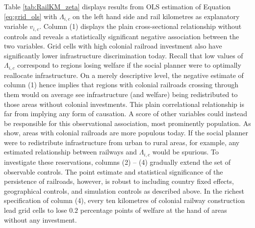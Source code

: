 \documentclass[11pt, oneside]{article}   	%
\begin{document}
Table \eqref{tab:RailKM_zeta} displays results from OLS estimation of Equation \eqref{eq:grid_ols} with $\Lambda_{i,c}$ on the left hand side and rail kilometres as explanatory variable $v_{i,c}$. Column (1) displays the plain cross-sectional relationship without controls and reveals a statistically significant negative association between the two variables. Grid cells with high colonial railroad investment also have significantly lower infrastructure discrimination today. Recall that low values of $\Lambda_{i,c}$ correspond to regions losing welfare if the social planner were to optimally reallocate infrastructure. On a merely descriptive level, the negative estimate of column (1) hence implies that regions with colonial railroads crossing through them would on average see infrastructure (and welfare) being redistributed to those areas without colonial investments. This plain correlational relationship is far from implying any form of causation. A score of other variables could instead be responsible for this observational association, most prominently population. As \citeauthor{jedwab_permanent_2016} show, areas with colonial railroads are more populous today. If the social planner were to redistribute infrastructure from urban to rural areas, for example, any estimated relationship between railways and $\Lambda_{i,c}$ would be spurious. To investigate these reservations, columns (2) -- (4) gradually extend the set of observable controls. The point estimate and statistical significance of the persistence of railroads, however, is robust to including country fixed effects, geographical controls, and simulation controls as described above. In the richest specification of column (4), every ten kilometres of colonial railway construction lead grid cells to lose $0.2$ percentage points of welfare at the hand of areas without any investment.
\end{document}
